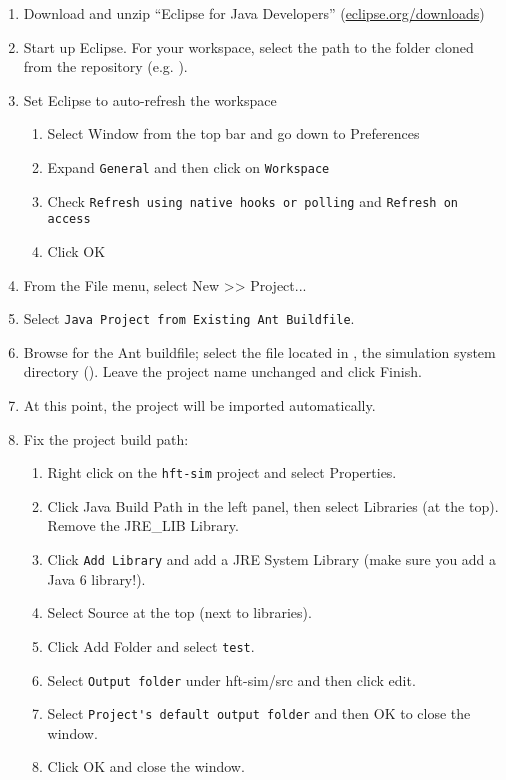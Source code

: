 \documentclass[11pt]{article}
\begin{document}
\begin{enumerate}
\item Download and unzip ``Eclipse for Java Developers'' (\href{http://www.eclipse.org/downloads/}{eclipse.org/downloads})
\item Start up Eclipse. For your workspace, select the path to
  the  folder cloned from the repository (e.g. ).
\item Set Eclipse to auto-refresh the workspace
  \begin{enumerate}
  \item Select Window from the top bar and go down to Preferences
  \item Expand \verb|General| and then click on \verb|Workspace|
  \item Check \verb|Refresh using native hooks or polling| and \verb|Refresh on access|
  \item Click OK
  \end{enumerate}
  
\item From the File menu, select New >> Project...
\item Select \verb|Java Project from Existing Ant Buildfile|.
\item Browse for the Ant buildfile; select the  file located in , the simulation system directory
  (). Leave the project name unchanged and
  click Finish.
\item At this point, the project will be imported automatically.
\item Fix the project build path:
  \begin{enumerate}
  \item Right click on the \verb|hft-sim| project and select Properties.
  \item Click Java Build Path in the left panel, then select Libraries (at the
    top). Remove the JRE\_LIB Library.
  \item Click \verb|Add Library| and add a JRE System Library (make sure you add a Java 6 library!).
  \item Select Source at the top (next to libraries).
  \item Click Add Folder and select \verb|test|.
  \item Select \verb|Output folder| under hft-sim/src and then click edit.
  \item Select \verb|Project's default output folder| and then OK to close the window.
  \item Click OK and close the window.
  \end{enumerate}


\end{enumerate}
\end{document}
